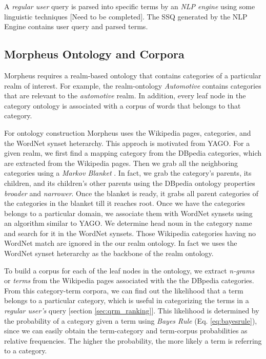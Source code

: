 A \textit{regular user} query is parsed into specific terms by an \textit{NLP
engine} using some linguistic techniques [Need to be completed]. The SSQ generated by the NLP
Engine contains user query and parsed terms. 


\subsection{Morpheus Ontology and Corpora} 
\label{sec:ontology_corpora}

Morpheus requires a realm-based ontology that contains categories of a
particular realm of interest. For example, the realm-ontology \textit{Automotive}
contains categories that are relevant to the \textit{automotive} realm. In
addition, every leaf node in the category ontology is associated with a corpus of words
that belongs to that category. 

For ontology construction Morpheus uses the Wikipedia pages, categories,
and the WordNet synset heterarchy. This approch is motivated from
YAGO\cite{Suchanek2009phd}. For a given realm, we first find a mapping category 
from the DBpedia categories, which are extracted from 
the Wikipedia pages\cite{Bizer2009}. Then we grab all the neighboring categories
using a \textit{Markov Blanket} \cite{PRIS}. In fact, we grab 
the category's parents, its children, and its 
children's other parents using the DBpedia ontology properties \textit{broader}
and \textit{narrower}. Once the blanket is ready, it grabs all parent categories
of the categories in the blanket till it reaches root. Once we have the
categories belongs to a particular domain, we associate them with WordNet synsets
using an algorithm similar to YAGO\cite{Suchanek2009phd}. We determine head noun in the
category name and search for it in the WordNet synsets.
Those Wikipedia categories having no WordNet match are ignored in the our realm
ontology. In fact we uses the WordNet synset heterarchy as the backbone of the   
realm ontology. 

To build a corpus for each of the leaf nodes in the ontology, 
we extract \emph{n-grams} or \emph{terms} from the Wikipedia pages associated with the 
the DBpedia categories\cite{Bizer2009}. From this category-term corpora, 
we can find out the likelihood that a term belongs to a particular category, 
which is useful in categorizing the terms in a \emph{regular user's} query [section \ref{sec:qrm_ranking}].    
This likelihood is determined by the probability of a category given a term 
using \textit{Bayes Rule} (Eq. \ref{eq:bayesrule}), since we can 
easily obtain the term-category and term-corpus probabilities as 
relative frequencies. The higher the probability, the more likely a 
term is referring to a category. 

